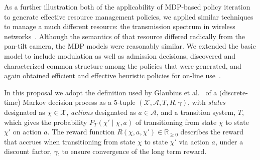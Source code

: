 As a further illustration both of the applicability of MDP-based
policy iteration to generate effective resource management policies,
we applied similar techniques to manage a much different resource:
the transmission spectrum in wireless networks~\cite{mskgct13}.  Although 
the semantics of that resource differed radically from the pan-tilt camera, 
the MDP models were reasonably similar.  We extended the basic model to
include modulation as well as admission decisions, discovered and characterized
common structure among the policies that were generated, and again obtained
efficient and effective heuristic policies for on-line use~\cite{mgc16}.

In this proposal we adopt the definition used by Glaubius et al.~\cite{gtsg08}
of a (discrete-time) Markov decision process as a 5-tuple
$(\mathcal{X}, \mathcal{A}, T, R, \gamma)$, with \emph{states} designated
as $\chi \in \mathcal{X}$, \emph{actions} designated as $a \in \mathcal{A}$,
and a transition system, $T$, which gives the probability
$P_T (\chi' \mid \chi, a)$ of transitioning from state $\chi$ to
state $\chi'$ on action $a$.
The reward function $R(\chi, a, \chi') \in \mathbb R_{\ge 0}$ describes the
reward that accrues when transitioning from state $\chi$ to
state $\chi'$ via action $a$, under a discount factor, $\gamma$,
to ensure convergence of the long term reward.

